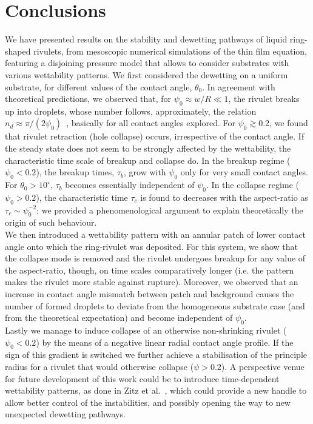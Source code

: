 \documentclass[%
 aip,
 amsmath,amssymb,
 reprint,%
]{revtex4-1}
\begin{document}
\section{Conclusions}\label{sec:conclu}
We have presented results on the stability and dewetting pathways of liquid ring-shaped rivulets, from mesoscopic numerical simulations of the thin film equation, featuring a disjoining pressure model that allows to consider substrates with various wettability patterns. 
We first considered the dewetting on a uniform substrate, for different values of the contact angle, $\theta_0$. 
In agreement with theoretical predictions, we observed that, for $\psi_0 \approx w/R \ll 1$, the rivulet breaks up into droplets, whose number follows, approximately, the relation $n_d \approx \pi/(2\psi_0)$~\cite{gonzalezStabilityLiquidRing2013}, basically for all contact angles explored.
For $\psi_0 \gtrsim 0.2$, we found that rivulet retraction (hole collapse) occurs, irrespective of the contact angle. 
If the steady state does not seem to be strongly affected by the wettability, the characteristic time scale of breakup and collapse do. 
In the breakup regime ($\psi_0 < 0.2$), the breakup times, $\tau_b$, grow with $\psi_0$ only for very small contact angles. 
For $\theta_0 > 10^{\circ}$, $\tau_b$ becomes essentially independent of $\psi_0$. 
In the collapse regime ($\psi_0 > 0.2$), the characteristic time $\tau_c$ is found to decreases with the aspect-ratio as $\tau_c  \sim \psi_0^{-2}$; we provided a phenomenological argument to explain theoretically the origin of such behaviour.\\
We then introduced a wettability pattern with an annular patch of lower contact angle onto which the ring-rivulet was deposited. 
For this system, we show that the collapse mode is removed and the rivulet undergoes breakup for any value of the aspect-ratio, though, on time scales comparatively longer (i.e. the pattern makes the rivulet more stable against rupture). 
Moreover, we observed that an increase in contact angle mismatch between patch and background causes the number of formed droplets to deviate from the homogeneous substrate case (and from the theoretical expectation) and become independent of $\psi_0$.\\
Lastly we manage to induce collapse of an otherwise non-shrinking rivulet ($\psi_0<0.2$) by the means of a negative linear radial contact angle profile.
If the sign of this gradient is switched we further achieve a stabilisation of the principle radius for a rivulet that would otherwise collapse ($\psi>0.2$). 
A perspective venue for future development of this work could be to introduce time-dependent wettability patterns, as done in Zitz et al.~\cite{zitzControllingDewettingMorphologies2023}, which could provide a new handle to allow better control of the instabilities, and possibly opening the way to new unexpected dewetting pathways.
\end{document}
